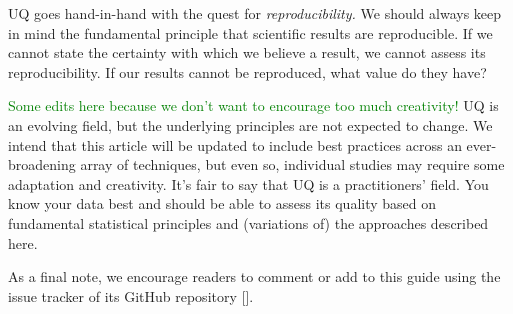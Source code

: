 UQ goes hand-in-hand with the quest for \emph{reproducibility.}  We should always keep in mind the fundamental principle that scientific results are reproducible.  If we cannot state the certainty with which we believe a result, we cannot assess its reproducibility.  If our results cannot be reproduced, what value do they have?

\textcolor{green}{Some edits here because we don't want to encourage too much creativity!}
UQ is an evolving field, but the underlying principles are not expected to change.
We intend that this article will be updated to include best practices across an ever-broadening array of techniques, but even so, individual studies may require some adaptation and creativity.
It's fair to say that UQ is a practitioners' field.  You know your data best and should be able to assess its quality based on fundamental statistical principles and (variations of) the approaches described here.

As a final note, we encourage readers to comment or add to this guide using the issue tracker of its GitHub repository [\githubrepository].
